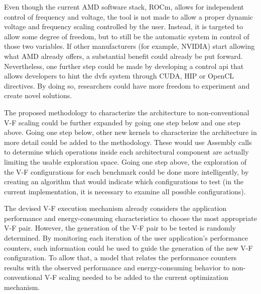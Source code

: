 Even though the current AMD software stack, ROCm, allows for independent control of frequency and voltage, the tool is not made to allow a proper dynamic voltage and frequency scaling controlled by the user. Instead, it is targeted to allow some degree of freedom, but to still be the automatic system in control of those two variables. If other manufacturers (for example, NVIDIA) start allowing what AMD already offers, a substantial benefit could already be put forward. Nevertheless, one further step could be made by developing a control \acrshort{api} that allows developers to hint the \acrshort{dvfs} system through CUDA, HIP or OpenCL directives. By doing so, researchers could have more freedom to experiment and create novel solutions.

The proposed methodology to characterize the architecture to non-conventional V-F scaling could be further expanded by going one step below and one step above. Going one step below, other new kernels to characterize the architecture in more detail could be added to the methodology. These would use Assembly calls to determine which operations inside each architectural component are actually limiting the usable exploration space. Going one step above, the exploration of the V-F configurations for each benchmark could be done more intelligently, by creating an algorithm that would indicate which configurations to test (in the current implementation, it is necessary to examine all possible configurations).

The devised V-F execution mechanism already considers the application performance and energy-consuming characteristics to choose the most appropriate V-F pair. However, the generation of the V-F pair to be tested is randomly determined. By monitoring each iteration of the user application's performance counters, such information could be used to guide the generation of the new V-F configuration. To allow that, a model that relates the performance counters results with the observed performance and energy-consuming behavior to non-conventional V-F scaling needed to be added to the current optimization mechanism.

